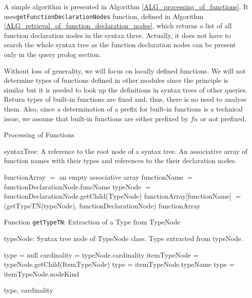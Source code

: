 A simple algorithm is presented in Algorithm \ref{ALG_processing_of_functions}. It uses\linebreak \texttt{getFunctionDeclarationNodes} function, defined in Algorithm \ref{ALG_retrieval_of_function_declaration_nodes}, which returns a list of all function declaration nodes in the syntax three. Actually, it does not have to search the whole syntax tree as the function declaration nodes can be present only in the query prolog section. 

Without loss of generality, we will focus on locally defined functions. We will not determine types of functions defined in other modules since the principle is similar but it is needed to look up the definitions in syntax trees of other queries. Return types of built-in functions are fixed and, thus, there is no need to analyse them. Also, since a determination of a prefix for built-in functions is a technical issue, we assume that built-in functions are either prefixed by $fn$ or not prefixed.

\begin{algorithm}
\caption{Processing of Functions}
\label{ALG_processing_of_functions}
\begin{algorithmic}[1]
\REQUIRE syntaxTree: A reference to the root node of a syntax tree.
\ENSURE An associative array of function names with their types and references to the their declaration nodes.

\STATE functionArray $=$ an empty associative array
    \STATE functionName $=$ functionDeclarationNode.funcName
    \STATE typeNode $=$ functionDeclarationNode.getChild(TypeNode)
    \STATE functionArray[functionName] $=$ \\ (getTypeTN(typeNode), functionDeclarationNode)
\ENDFOR
\RETURN functionArray
\end{algorithmic}
\end{algorithm}

\begin{algorithm}
\caption{Function \texttt{getTypeTN}: Extraction of a Type from TypeNode}
\label{ALG_extraction_of_a_type_from_typenode}
\begin{algorithmic}[1]
\REQUIRE typeNode: Syntax tree node of TypeNode class.
\ENSURE Type extracted from typeNode.

\STATE type = null
\STATE cardinality = typeNode.cardinality
\STATE itemTypeNode = typeNode.getChild(ItemTypeNode)
    \STATE type = itemTypeNode.typeName
    \STATE type = itemTypeNode.nodeKind
\ENDIF

\RETURN type, cardinality
\end{algorithmic}
\end{algorithm}

